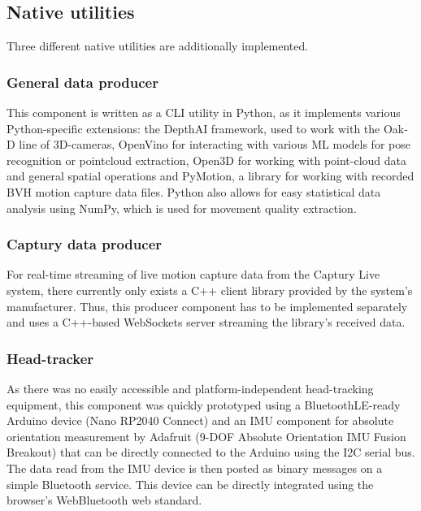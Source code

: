 \subsection{Native utilities}

Three different native utilities are additionally implemented.

\subsubsection{General data producer}

This component is written as a \ac{CLI} utility in Python, as it implements various Python-specific extensions: the DepthAI framework, used to work with the Oak-D line of \ac{3D}-cameras, OpenVino for interacting with various \ac{ML} models for pose recognition or pointcloud extraction, Open3D for working with point-cloud data and general spatial operations and PyMotion, a library for working with recorded \ac{BVH} motion capture data files. Python also allows for easy statistical data analysis using NumPy, which is used for movement quality extraction.

\subsubsection{Captury data producer}

For real-time streaming of live motion capture data from the Captury Live system, there currently only exists a C++ client library provided by the system's manufacturer. Thus, this producer component has to be implemented separately and uses a C++-based WebSockets server streaming the library's received data.

\subsubsection{Head-tracker}

As there was no easily accessible and platform-independent head-tracking equipment, this component was quickly prototyped using a BluetoothLE-ready Arduino device (Nano RP2040 Connect) and an \ac{IMU} component for absolute orientation measurement by Adafruit (9-DOF Absolute Orientation IMU Fusion Breakout) that can be directly connected to the Arduino using the \ac{I2C} serial bus. The data read from the \ac{IMU} device is then posted as binary messages on a simple Bluetooth service. This device can be directly integrated using the browser's WebBluetooth web standard.

